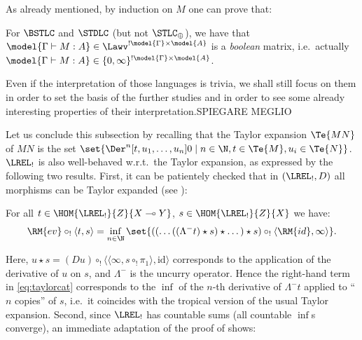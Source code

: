 As already mentioned, by induction on $M$ %
one can prove that:

\begin{proposition}\label{prop:descrete}
 For $\BSTLC$ and $\STDLC$ (but not $\STLC_\oplus$), we have that $\model{\Gamma\vdash M:A}\in\Lawv^{!\model{\Gamma}\times\model{A}}$ is a \emph{boolean} matrix, i.e.\ actually $\model{\Gamma\vdash M:A}\in\{0,\infty\}^{!\model{\Gamma}\times\model{A}}$.
\end{proposition}

Even if the interpretation of those languages is trivia, we shall still focus on them in order to set the basis of the further studies and in order to see some already interesting properties of their interpretation.{\color{red}SPIEGARE MEGLIO}

Let us conclude this subsection by recalling that the Taylor expansion $\Te{MN}$ of $MN$ is the set $\set{\Der^{n}[t,u_1,\dots,u_n]0 \mid n\in\N,t\in\Te{M},u_i\in\Te{N}}$.
$\LREL_!$ is also well-behaved w.r.t.\ the Taylor expansion, as expressed by the following two results.
First, it can be patientely checked that in $(\LREL_!,D)$ all morphisms can be Taylor expanded  (see \cite[Definition 4.22]{Manzo2012}):

\begin{theorem}\label{thm:modelsTaylor}
 For all $t\in\HOM{\LREL_!}{Z}{X\multimap Y}$, $s\in\HOM{\LREL_!}{Z}{X}$ we have:%
 \begin{align}\label{eq:taylorcat}
  \RM{ev}\circ_!\langle t,s\rangle =
  \inf\limits_{n\in\N}
  \set{((\dots((\Lambda^- t)\star s)\star \dots)\star s)\circ_! \langle \RM{id},\infty \rangle}.
 \end{align} 
\end{theorem}
Here,
$u\star s= (Du)\circ_{!} \langle \langle  \infty, s\circ_{!} \pi_{1}\rangle,\mathrm{id}\rangle$ corresponds to the application of the derivative of $u$ on $s$, and $\Lambda^-$ is the uncurry operator.
Hence the right-hand term in \eqref{eq:taylorcat} corresponds to the $\inf$ of the $n$-th derivative of $\Lambda^{-}t$ applied to ``$n$ copies'' of $s$,  i.e.~it coincides with the tropical %
version of the usual Taylor expansion.
Second, since $\LREL_!$ has countable sums (all countable $\inf$s converge), an immediate adaptation of the proof of \cite[Theorem 4.23]{Manzo2012} shows:

